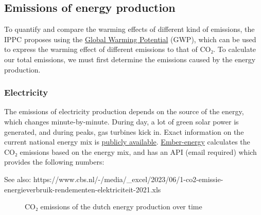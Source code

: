 \documentclass[
  letterpaper,
  DIV=11,
  numbers=noendperiod]{scrartcl}
\begin{document}
\subsection{Emissions of energy
production}\label{emissions-of-energy-production}

To quantify and compare the warming effects of different kind of
emissions, the IPPC proposes using the
\href{https://archive.ipcc.ch/ipccreports/tar/wg1/247.htm\#:~:text=The\%20GWP\%20has\%20been\%20defined,reference\%20gas\%20(IPCC\%2C\%20l990)\%3A}{Global
Warming Potential} (GWP), which can be used to express the warming
effect of different emissions to that of CO₂. To calculate our total
emissions, we must first determine the emissions caused by the energy
production.

\subsubsection{Electricity}\label{electricity}

The emissions of electricity production depends on the source of the
energy, which changes minute-by-minute. During day, a lot of green solar
power is generated, and during peaks, gas turbines kick in. Exact
information on the current national energy mix is
\href{https://ned.nl/nl/dataportaal/energie-productie/elektriciteit/totale-elektriciteitsproductie}{publicly
available}.
\href{https://ember-energy.org/data/electricity-data-explorer/\#data-tool}{Ember-energy}
calculates the CO₂ emissions based on the energy mix, and has an API
(email required) which provides the following numbers:

See also:
https://www.cbs.nl/-/media/\_excel/2023/06/1-co2-emissie-energieverbruik-rendementen-elektriciteit-2021.xls

\label{cell-fig-energy-intensity}
\begin{figure}[H]


\caption{\label{fig-energy-intensity}CO₂ emissions of the dutch energy
production over time}

\end{figure}%
\end{document}
